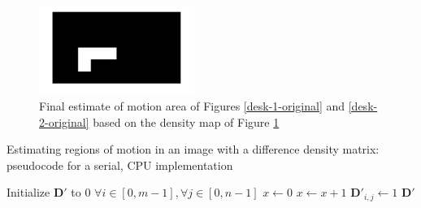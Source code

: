 \documentclass[journal]{IEEEtran}
\begin{document}
\begin{figure}[]
	\centering
	\includegraphics[width=0.45\textwidth]{desk_motion_area.jpg}
	\caption{Final estimate of motion area of Figures \ref{desk-1-original} and \ref{desk-2-original} based on the density map of Figure \ref{desk-difference-density}}
    \label{desk-difference-density}
\end{figure}
\begin{algorithm}[]
	\smaller
	\label{difference-density-matrix-algorithm}
	\caption{Estimating regions of motion in an image with a difference density matrix: pseudocode for a serial, CPU implementation}
	
	
	\nl Initialize $\boldsymbol{D}'$ to 0 $\forall i \in [0, m - 1], \forall j \in [0, n - 1]$\;
	\nl {} {
		\nl {} {
			\nl $x \gets 0$
			\nl {} {
				\nl {} {
					\nl {} {
						\nl $x \gets x + 1$\;
					}
				}
			}
			\nl {} {
				\nl $\boldsymbol{D}'_{i, j} \gets 1$\;
			}
		}
	}
	\nl \Return $\boldsymbol{D}'$\;
	\
\end{algorithm}
\end{document}

